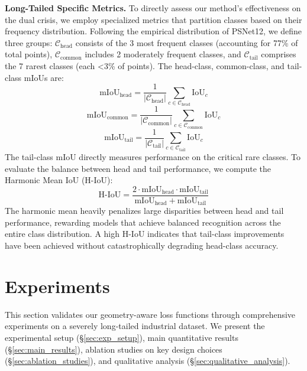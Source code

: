 \documentclass[preprint,12pt]{elsarticle}
\begin{document}
\textbf{Long-Tailed Specific Metrics.} To directly assess our method's effectiveness on the dual crisis, we employ specialized metrics that partition classes based on their frequency distribution. Following the empirical distribution of PSNet12, we define three groups: \(\mathcal{C}_{\text{head}}\) consists of the 3 most frequent classes (accounting for 77\% of total points), \(\mathcal{C}_{\text{common}}\) includes 2 moderately frequent classes, and \(\mathcal{C}_{\text{tail}}\) comprises the 7 rarest classes (each <3\% of points). The head-class, common-class, and tail-class mIoUs are:
\begin{equation}
\label{eq:head_miou}
\text{mIoU}_{\text{head}} = \frac{1}{|\mathcal{C}_{\text{head}}|} \sum_{c \in \mathcal{C}_{\text{head}}} \text{IoU}_c
\end{equation}
\begin{equation}
\label{eq:common_miou}
\text{mIoU}_{\text{common}} = \frac{1}{|\mathcal{C}_{\text{common}}|} \sum_{c \in \mathcal{C}_{\text{common}}} \text{IoU}_c
\end{equation}
\begin{equation}
\label{eq:tail_miou}
\text{mIoU}_{\text{tail}} = \frac{1}{|\mathcal{C}_{\text{tail}}|} \sum_{c \in \mathcal{C}_{\text{tail}}} \text{IoU}_c
\end{equation}
The tail-class mIoU directly measures performance on the critical rare classes. To evaluate the balance between head and tail performance, we compute the Harmonic Mean IoU (H-IoU):
\begin{equation}
\label{eq:hiou}
\text{H-IoU} = \frac{2 \cdot \text{mIoU}_{\text{head}} \cdot \text{mIoU}_{\text{tail}}}{\text{mIoU}_{\text{head}} + \text{mIoU}_{\text{tail}}}
\end{equation}
The harmonic mean heavily penalizes large disparities between head and tail performance, rewarding models that achieve balanced recognition across the entire class distribution. A high H-IoU indicates that tail-class improvements have been achieved without catastrophically degrading head-class accuracy.

\section{Experiments}
\label{sec:experiments}
This section validates our geometry-aware loss functions through comprehensive experiments on a severely long-tailed industrial dataset. We present the experimental setup (\S\ref{sec:exp_setup}), main quantitative results (\S\ref{sec:main_results}), ablation studies on key design choices (\S\ref{sec:ablation_studies}), and qualitative analysis (\S\ref{sec:qualitative_analysis}).
\end{document}
